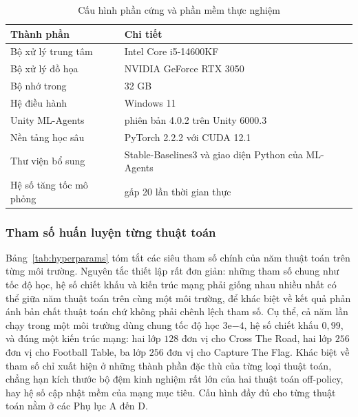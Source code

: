 \begin{table}[H]
\centering
\caption{Cấu hình phần cứng và phần mềm thực nghiệm}
\label{tab:hardware}
\renewcommand{\arraystretch}{1.4}
\tablefont
\begin{tabular}{|p{4.5cm}|p{9cm}|}
\hline
\textbf{Thành phần} & \textbf{Chi tiết} \\
\hline
Bộ xử lý trung tâm & Intel Core i5-14600KF \\
\hline
Bộ xử lý đồ họa & NVIDIA GeForce RTX 3050 \\
\hline
Bộ nhớ trong & 32 GB \\
\hline
Hệ điều hành & Windows 11 \\
\hline
Unity ML-Agents & phiên bản 4.0.2 trên Unity 6000.3 \\
\hline
Nền tảng học sâu & PyTorch 2.2.2 với CUDA 12.1 \\
\hline
Thư viện bổ sung & Stable-Baselines3 và giao diện Python của ML-Agents \\
\hline
Hệ số tăng tốc mô phỏng & gấp 20 lần thời gian thực \\
\hline
\end{tabular}
\end{table}

\subsubsection{Tham số huấn luyện từng thuật toán}
\indent Bảng~\ref{tab:hyperparams} tóm tắt các siêu tham số chính của năm thuật toán trên
từng môi trường. Nguyên tắc thiết lập rất đơn giản: những tham số chung như tốc độ học, hệ
số chiết khấu và kiến trúc mạng phải giống nhau nhiều nhất có thể giữa năm thuật toán trên
cùng một môi trường, để khác biệt về kết quả phản ánh bản chất thuật toán chứ không phải
chênh lệch tham số. Cụ thể, cả năm lần chạy trong một môi trường dùng chung tốc độ học
$3\text{e}{-4}$, hệ số chiết khấu $0{,}99$, và đúng một kiến trúc mạng: hai lớp $128$ đơn vị
cho Cross The Road, hai lớp $256$ đơn vị cho Football Table, ba lớp $256$ đơn vị cho Capture
The Flag. Khác biệt về tham số chỉ
xuất hiện ở những thành phần đặc thù của từng loại thuật toán, chẳng hạn kích thước bộ đệm
kinh nghiệm rất lớn của hai thuật toán off-policy, hay hệ số cập nhật mềm của mạng mục
tiêu. Cấu hình đầy đủ cho từng thuật toán nằm ở các Phụ lục A đến D.

